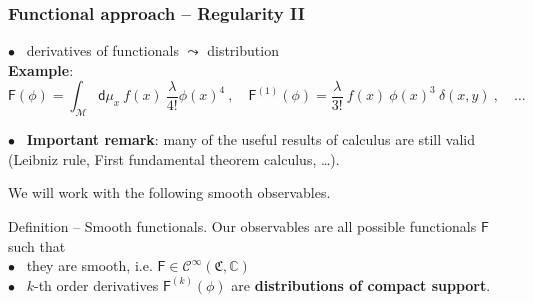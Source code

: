 \documentclass[9pt]{beamer}
\newcommand{\Ccal}{\mathcal{C}}
\newcommand{\Mcal}{\mathcal{M}}
\newcommand{\Cbb}{\mathbb{C}}
\newcommand{\Crak}{\mathfrak{C}}
\newcommand{\Fsf}{\mathsf{F}}
\newcommand{\dsf}{\mathsf{d}}
\begin{document}
\begin{frame}

\frametitle{Functional approach -- Regularity II}

\vfill

$\bullet$ \ derivatives of functionals $\leadsto$ distribution \\
\hspace*{8pt} \textbf{Example}: 
\begin{equation*}
\Fsf(\phi) = \int_\Mcal \dsf\mu_x \ f(x) \ \frac{\lambda}{4!} \phi(x)^4 \ , \quad \Fsf^{(1)}(\phi) =  \frac{\lambda}{3!} \ f(x) \ \phi(x)^3 \ \delta(x,y) \ , \quad \dots
\end{equation*}

\vfill

$\bullet$ \ \textbf{Important remark}: many of the useful results of calculus are still valid (Leibniz rule, First fundamental theorem calculus, \dots). \\[5pt]

\vfill

We will work with the following smooth observables. \\[5pt]

\begin{block}{Definition --  Smooth functionals.}
Our observables are all possible functionals $\Fsf$ such that \\
\qquad $\bullet$ \ they are smooth, i.e. $\Fsf \in \Ccal^\infty(\Crak,\Cbb)$ \\
\qquad $\bullet$ \ $k$-th order derivatives $\Fsf^{(k)}(\phi)$ are \textbf{distributions of compact support}.
\end{block}

\vfill

\end{frame}

\end{document}
